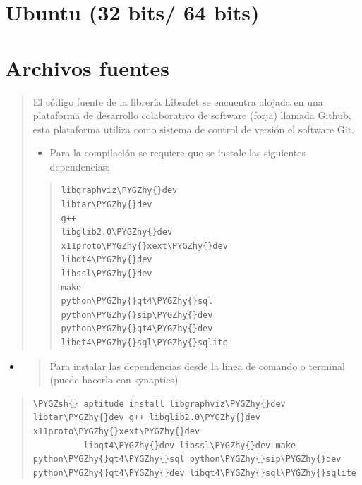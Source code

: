 \documentclass[letterpaper,11pt,spanish]{sphinxmanual}
\def\PYGZsh{\char`\#}
\def\PYGZhy{\char`\-}
\begin{document}
\chapter{Ubuntu (32 bits/ 64 bits)}
\label{_templates/Contenido1/Safet_para_Ubuntu:ubuntu-32-bits-64-bits}\label{_templates/Contenido1/Safet_para_Ubuntu::doc}

\chapter{Archivos fuentes}
\label{_templates/Contenido1/Dependencias:archivos-fuentes}\label{_templates/Contenido1/Dependencias::doc}\begin{quote}

El código fuente de la librería Libsafet se encuentra alojada en una plataforma de desarrollo colaborativo de software (forja) llamada Github, esta plataforma utiliza como sistema de control de versión el software Git.
\begin{itemize}
\item {} 
Para la compilación se requiere que se instale las siguientes dependencias:

\end{itemize}
\begin{quote}

\begin{Verbatim}[commandchars=\\\{\}]
libgraphviz\PYGZhy{}dev
libtar\PYGZhy{}dev
g++
libglib2.0\PYGZhy{}dev
x11proto\PYGZhy{}xext\PYGZhy{}dev
libqt4\PYGZhy{}dev
libssl\PYGZhy{}dev
make
python\PYGZhy{}qt4\PYGZhy{}sql
python\PYGZhy{}sip\PYGZhy{}dev
python\PYGZhy{}qt4\PYGZhy{}dev
libqt4\PYGZhy{}sql\PYGZhy{}sqlite
\end{Verbatim}
\end{quote}
\end{quote}
\begin{itemize}
\item {} \begin{quote}\begin{description}
\item[{Para instalar las dependencias desde la línea de comando o terminal (puede hacerlo con synaptics)}] \leavevmode
\end{description}\end{quote}

\end{itemize}
\begin{quote}

\begin{Verbatim}[commandchars=\\\{\}]
\PYGZsh{} aptitude install libgraphviz\PYGZhy{}dev libtar\PYGZhy{}dev g++ libglib2.0\PYGZhy{}dev x11proto\PYGZhy{}xext\PYGZhy{}dev
          libqt4\PYGZhy{}dev libssl\PYGZhy{}dev make python\PYGZhy{}qt4\PYGZhy{}sql python\PYGZhy{}sip\PYGZhy{}dev python\PYGZhy{}qt4\PYGZhy{}dev libqt4\PYGZhy{}sql\PYGZhy{}sqlite
\end{Verbatim}
\end{quote}
\end{document}
